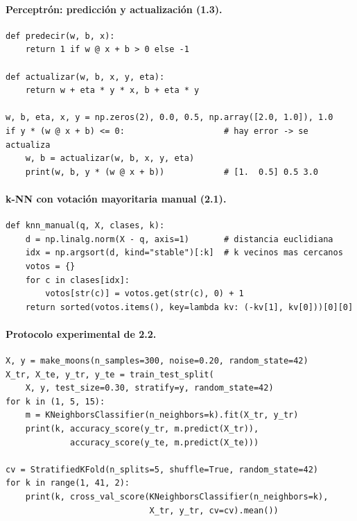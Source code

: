 \documentclass[11pt,a4paper]{article}
\begin{document}
\paragraph{Perceptrón: predicción y actualización (1.3).}
\begin{lstlisting}
def predecir(w, b, x):
    return 1 if w @ x + b > 0 else -1

def actualizar(w, b, x, y, eta):
    return w + eta * y * x, b + eta * y

w, b, eta, x, y = np.zeros(2), 0.0, 0.5, np.array([2.0, 1.0]), 1.0
if y * (w @ x + b) <= 0:                    # hay error -> se actualiza
    w, b = actualizar(w, b, x, y, eta)
    print(w, b, y * (w @ x + b))            # [1.  0.5] 0.5 3.0
\end{lstlisting}

\paragraph{k-NN con votación mayoritaria manual (2.1).}
\begin{lstlisting}
def knn_manual(q, X, clases, k):
    d = np.linalg.norm(X - q, axis=1)       # distancia euclidiana
    idx = np.argsort(d, kind="stable")[:k]  # k vecinos mas cercanos
    votos = {}
    for c in clases[idx]:
        votos[str(c)] = votos.get(str(c), 0) + 1
    return sorted(votos.items(), key=lambda kv: (-kv[1], kv[0]))[0][0]
\end{lstlisting}

\paragraph{Protocolo experimental de 2.2.}
\begin{lstlisting}
X, y = make_moons(n_samples=300, noise=0.20, random_state=42)
X_tr, X_te, y_tr, y_te = train_test_split(
    X, y, test_size=0.30, stratify=y, random_state=42)
for k in (1, 5, 15):
    m = KNeighborsClassifier(n_neighbors=k).fit(X_tr, y_tr)
    print(k, accuracy_score(y_tr, m.predict(X_tr)),
             accuracy_score(y_te, m.predict(X_te)))

cv = StratifiedKFold(n_splits=5, shuffle=True, random_state=42)
for k in range(1, 41, 2):
    print(k, cross_val_score(KNeighborsClassifier(n_neighbors=k),
                             X_tr, y_tr, cv=cv).mean())
\end{lstlisting}
\end{document}
